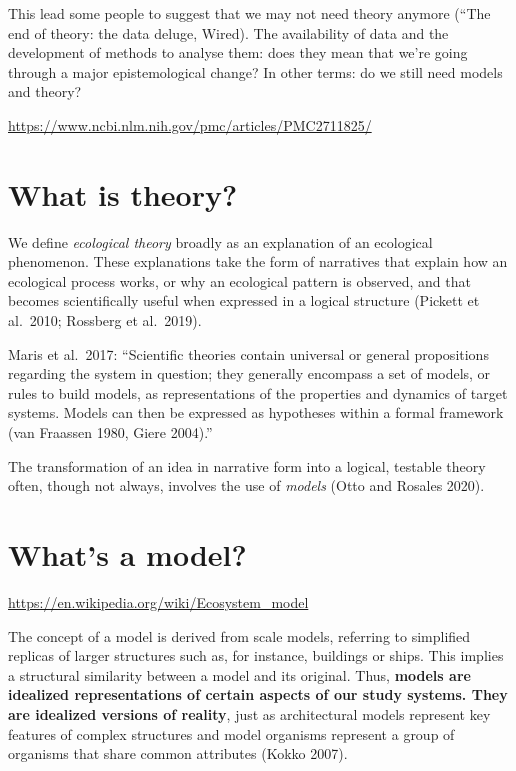 \documentclass[
]{book}
\theoremstyle{definition}
\theoremstyle{definition}
\theoremstyle{definition}
\theoremstyle{definition}
\theoremstyle{remark}
\begin{document}
This lead some people to suggest that we may not need theory anymore (``The end of theory: the data deluge, Wired). The availability of data and the development of methods to analyse them: does they mean that we're going through a major epistemological change? In other terms: do we still need models and theory?

\url{https://www.ncbi.nlm.nih.gov/pmc/articles/PMC2711825/}

\section{What is theory?}\label{what-is-theory}

We define \emph{ecological theory} broadly as an explanation of an ecological phenomenon. These explanations take the form of narratives that explain how an ecological process works, or why an ecological pattern is observed, and that becomes scientifically useful when expressed in a logical structure (Pickett et al.~2010; Rossberg et al.~2019).

Maris et al.~2017: ``Scientific theories contain universal or general propositions regarding the system in question; they generally encompass a set of models, or rules to build models, as representations of the properties and dynamics of target systems. Models can then be expressed as hypotheses within a formal framework (van Fraassen 1980, Giere 2004).''

The transformation of an idea in narrative form into a logical, testable theory often, though not always, involves the use of \emph{models} (Otto and Rosales 2020).

\section{What's a model?}\label{whats-a-model}

\url{https://en.wikipedia.org/wiki/Ecosystem_model}

The concept of a model is derived from scale models, referring to simplified replicas of larger structures such as, for instance, buildings or ships. This implies a structural similarity between a model and its original. Thus, \textbf{models are idealized representations of certain aspects of our study systems. They are idealized versions of reality}, just as architectural models represent key features of complex structures and model organisms represent a group of organisms that share common attributes (Kokko 2007).
\end{document}
